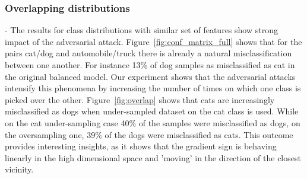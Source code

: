 \documentclass[runningheads,a4paper]{llncs}
\begin{document}
\subsubsection{Overlapping distributions} - The results for class distributions with similar set of features show strong impact of the adversarial attack. Figure~\ref{fig:conf_matrix_full} shows that for the pairs cat/dog and automobile/truck there is already a natural misclassification between one another. For instance 13\% of dog samples as misclassified as cat in the original balanced model. Our experiment shows that the adversarial attacks intensify this phenomena by increasing the number of times on which one class is picked over the other. Figure~\ref{fig:overlap} shows that cats are increasingly misclassified as dogs when under-sampled dataset on the cat class is used. While on the cat under-sampling case 40\% of the samples were misclassified as dogs, on the oversampling one, 39\% of the dogs were misclassified as cats. This outcome provides interesting insights, as it shows that the gradient sign is behaving linearly in the high dimensional space and 'moving' in the direction of the closest vicinity.
\end{document}
